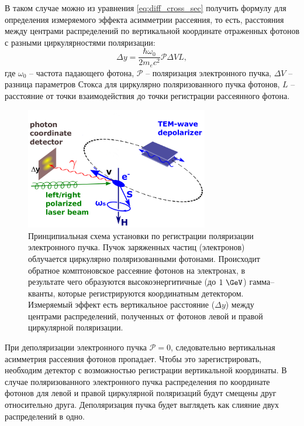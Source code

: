  \par В таком случае можно из уравнения \ref{eq:diff_cross_sec} получить формулу для определения измеряемого эффекта асимметрии рассеяния, то есть, расстояния между центрами распределений по вертикальной координате отраженных фотонов с разными циркулярностями поляризации:
\begin{equation}
	\Delta y = \frac{\hbar \omega_0}{2 m_e c^2} \mathcal{P} \Delta V L,
	\label{eq:pol_effect}
\end{equation}
где $\omega_0$ -- частота падающего фотона, $\mathcal{P}$ -- поляризация электронного пучка, $\Delta V$ -- разница параметров Стокса для циркулярно поляризованного пучка фотонов, $L$ -- расстояние от точки взаимодействия до точки регистрации рассеянного фотона. 
\begin{figure}[H]
	\begin{center}
		\includegraphics[width = 8cm]{img/mrd-lsrp.png}
		\caption{Принципиальная схема установки по регистрации поляризации электронного пучка. Пучок заряженных частиц (электронов) облучается циркулярно поляризованными фотонами. Происходит обратное комптоновское рассеяние фотонов на электронах, в результате чего образуются высокоэнергитичные (до $1~\GeV$) гамма--кванты, которые регистрируются координатным детектором. Измеряемый эффект есть вертикальное расстояние ($\Delta y$) между центрами распределений, полученных от фотонов левой и правой циркулярной поляризации.}
		\label{fig:laser_polarimeter_scheme}
	\end{center}
\end{figure}
\vspace{-20pt}
При деполяризации электронного пучка $\mathcal{P} = 0$, следовательно вертикальная асимметрия рассеяния фотонов пропадает. Чтобы это зарегистрировать, необходим детектор с возможностью регистрации вертикальной координаты. В случае поляризованного электронного пучка распределения по координате фотонов для левой и правой циркулярной поляризаций будут смещены друг относительно друга. Деполяризация пучка будет выглядеть как слияние двух распределений в одно.\vspace{-10pt}

